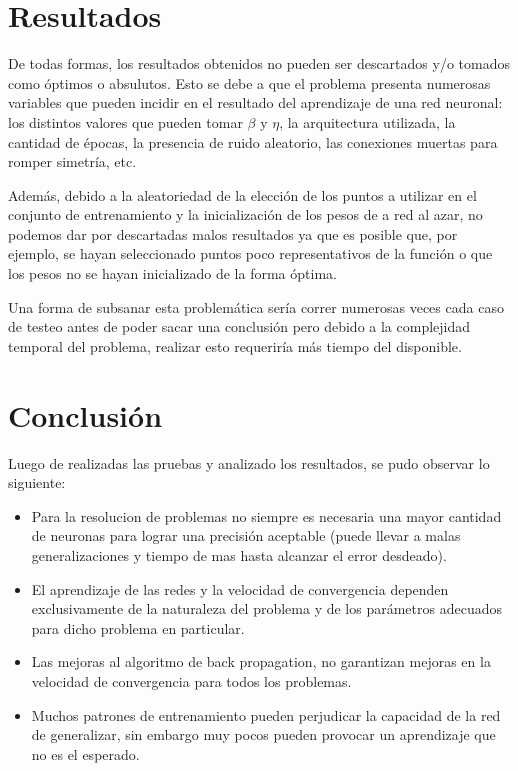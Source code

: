 \documentclass[%
    final,
    reprint,
    notitlepage,
    narroweqnarray,
    inline,
    twoside,
    invited
    ]{ieee}
\begin{document}
\section{Resultados}

\par De todas formas, los resultados obtenidos no pueden ser descartados y/o tomados como óptimos o absulutos. Esto se debe a que el problema presenta numerosas variables que pueden incidir en el resultado del aprendizaje de una red neuronal: los distintos valores que pueden tomar $\beta$ y $\eta$, la arquitectura utilizada, la cantidad de épocas, la presencia de ruido aleatorio, las conexiones muertas para romper simetría, etc.
\par Además, debido a la aleatoriedad de la elección de los puntos a utilizar en el conjunto de entrenamiento y la inicialización de los pesos de a red al azar, no podemos dar por descartadas malos resultados ya que es posible que, por ejemplo, se hayan seleccionado puntos poco representativos de la función o que los pesos no se hayan inicializado de la forma óptima.
\par Una forma de subsanar esta problemática sería correr numerosas veces cada caso de testeo antes de poder sacar una conclusión pero debido a la complejidad temporal del problema, realizar esto requeriría más tiempo del disponible.



\section{Conclusión}

Luego de realizadas las pruebas y analizado los resultados, se pudo observar lo siguiente:\\
\begin{itemize}
\item Para la resolucion de problemas no siempre es necesaria una mayor cantidad de neuronas para lograr una precisión aceptable (puede llevar a malas generalizaciones y tiempo de mas hasta alcanzar el error desdeado). \\
\item El aprendizaje de las redes y la velocidad de convergencia dependen exclusivamente de la naturaleza del problema y de los parámetros adecuados para dicho problema en particular.\\
\item Las mejoras al algoritmo de back propagation, no garantizan mejoras en la velocidad de convergencia para todos los problemas.\\
\item Muchos patrones de entrenamiento pueden perjudicar la capacidad de la red de generalizar, sin embargo muy pocos pueden provocar un aprendizaje que no es el esperado.\\
\end{itemize}
\end{document}
